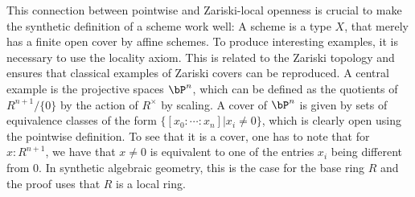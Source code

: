 This connection between pointwise and Zariski-local openness is crucial to make the synthetic definition of a scheme work well:
A scheme is a type $X$, that merely has a finite open cover by affine schemes.
To produce interesting examples, it is necessary to use the locality axiom.
This is related to the Zariski topology and ensures that classical examples of Zariski covers can be reproduced.
A central example is the projective spaces $\bP^n$, which can be defined as the quotients of $R^{n+1}/\{0\}$ by the action of $R^\times$ by scaling.
A cover of $\bP^n$ is given by sets of equivalence classes of the form $\{[x_0:\cdots:x_n] \vert x_i\neq 0 \}$, which is clearly open using the pointwise definition.
To see that it is a cover, one has to note that for $x:R^{n+1}$, we have that $x\neq 0$ is equivalent to one of the entries $x_i$ being different from $0$. In synthetic algebraic geometry, this is the case for the base ring $R$ and the proof uses that $R$ is a local ring.
